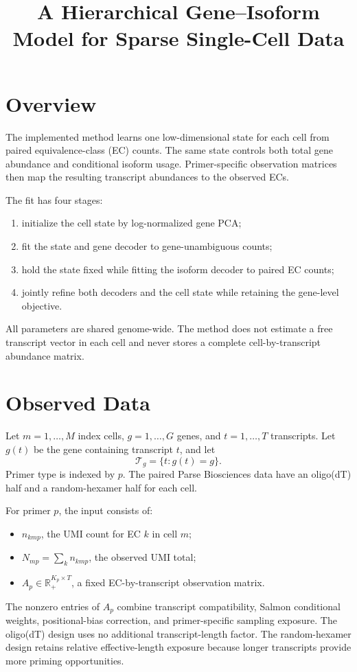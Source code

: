 \documentclass[11pt]{article}
\title{A Hierarchical Gene--Isoform Model for Sparse Single-Cell Data}
\author{}
\date{}
\begin{document}
\maketitle

\section*{Overview}

The implemented method learns one low-dimensional state for each cell from
paired equivalence-class (EC) counts. The same state controls both total gene
abundance and conditional isoform usage. Primer-specific observation matrices
then map the resulting transcript abundances to the observed ECs.

The fit has four stages:
\begin{enumerate}[leftmargin=*]
  \item initialize the cell state by log-normalized gene PCA;
  \item fit the state and gene decoder to gene-unambiguous counts;
  \item hold the state fixed while fitting the isoform decoder to paired EC
  counts;
  \item jointly refine both decoders and the cell state while retaining the
  gene-level objective.
\end{enumerate}
All parameters are shared genome-wide. The method does not estimate a free
transcript vector in each cell and never stores a complete cell-by-transcript
abundance matrix.

\section*{Observed Data}

Let \(m=1,\ldots,M\) index cells, \(g=1,\ldots,G\) genes, and
\(t=1,\ldots,T\) transcripts. Let \(g(t)\) be the gene containing transcript
\(t\), and let
\[
  \mathcal T_g=\{t:g(t)=g\}.
\]
Primer type is indexed by \(p\). The paired Parse Biosciences data have an
oligo(dT) half and a random-hexamer half for each cell.

For primer \(p\), the input consists of:
\begin{itemize}[leftmargin=*]
  \item \(n_{kmp}\), the UMI count for EC \(k\) in cell \(m\);
  \item \(N_{mp}=\sum_k n_{kmp}\), the observed UMI total;
  \item \(A_p\in\mathbb R_+^{K_p\times T}\), a fixed
  EC-by-transcript observation matrix.
\end{itemize}
The nonzero entries of \(A_p\) combine transcript compatibility, Salmon
conditional weights, positional-bias correction, and primer-specific
sampling exposure. The oligo(dT) design uses no additional transcript-length
factor. The random-hexamer design retains relative effective-length exposure
because longer transcripts provide more priming opportunities.
\end{document}
